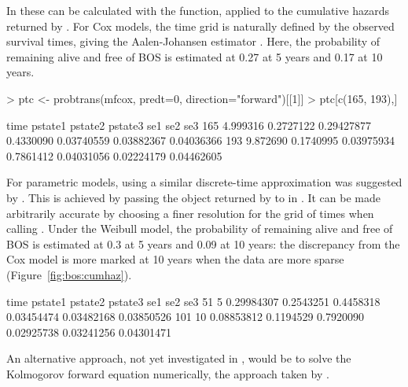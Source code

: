 \documentclass[nojss,nofooter]{jss}
\begin{document}
In  these can be calculated with the 
function, applied to the cumulative hazards returned by .
For Cox models, the time grid is naturally defined by the observed 
survival times, giving the
Aalen-Johansen estimator \citet{andersen}.  Here, the probability of
remaining alive and free of BOS is estimated at 0.27 at 5 years and 0.17
at 10 years.
\begin{Schunk}
\begin{Sinput}
> ptc <- probtrans(mfcox, predt=0, direction="forward")[[1]]
> ptc[c(165, 193),]
\end{Sinput}
\begin{Soutput}
        time   pstate1    pstate2   pstate3        se1        se2        se3
165 4.999316 0.2727122 0.29427877 0.4330090 0.03740559 0.03882367 0.04036366
193 9.872690 0.1740995 0.03975934 0.7861412 0.04031056 0.02224179 0.04462605
\end{Soutput}
\end{Schunk}
For parametric models, using a similar discrete-time approximation was
suggested by \citet{cook:lawless}.  This
is achieved by passing the object returned by 
to  in .  It can be made arbitrarily
accurate by choosing a finer resolution for the grid of times when 
calling .  Under the Weibull model, the probability 
of remaining alive and free
of BOS is estimated at 0.3 at 5 years and 0.09 at 10 years: the
discrepancy from the Cox model is more marked at 10 years when the
data are more sparse (Figure~\ref{fig:bos:cumhaz}).
\begin{Schunk}
\begin{Soutput}
    time    pstate1   pstate2   pstate3        se1        se2        se3
51     5 0.29984307 0.2543251 0.4458318 0.03454474 0.03482168 0.03850526
101   10 0.08853812 0.1194529 0.7920090 0.02925738 0.03241256 0.04301471
\end{Soutput}
\end{Schunk}
An alternative approach, not yet investigated in , would
be to solve the Kolmogorov forward equation numerically, the approach
taken by \citet{titman:nonhomog}.
\end{document}
